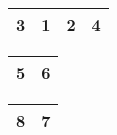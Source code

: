 \begin{frame}
\begin{table}
\begin{tabular}{| c | c | c | c |}
\hline
3 & 1 & 2 & 4 \\ 
\hline
\end{tabular}
\quad
\begin{tabular}{| c | c |}
\hline
\cellcolor{blue!25}5 & \cellcolor{blue!25}6\\ 
\hline
\end{tabular}
\quad
\begin{tabular}{| c | c |}
\hline
8 & 7 \\ 
\hline
\end{tabular}
\end{table}
\end{frame}


